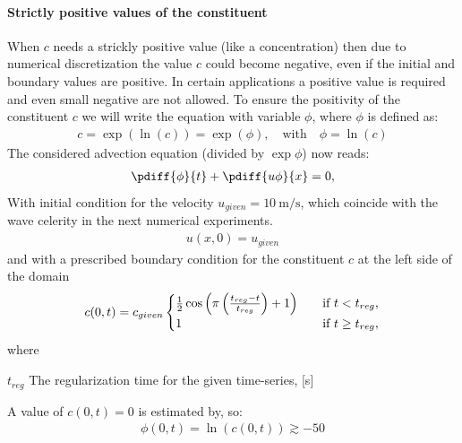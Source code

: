 \paragraph*{Strictly positive values of the constituent}
When $c$ needs a strickly positive value (like a concentration) then due to numerical discretization the value $c$ could become negative, even if the initial and boundary values are positive.
In certain applications a positive value is required and even small negative are not allowed.
To ensure the positivity of the constituent $c$ we will write the equation with variable $\phi$, where $\phi$ is defined as:
\begin{align}
    c = \exp(\ln(c)) =  \exp(\phi), \quad \text{with} \quad \phi = \ln(c)
\end{align}
The considered advection equation (divided by $\exp\phi$) now reads:
\begin{align}
    \pdiff{\phi}{t} + \pdiff{u\phi}{x} = 0,\label{eq:1d_advec_phi}
\end{align}
With initial condition for the velocity $u_{given} = \SI{10}{\metre\per\second}$, which coincide with the wave celerity in the next numerical experiments.
\begin{align}
    u(x,0) = u_{given}
\end{align}
and with a prescribed boundary condition for the constituent $c$ at the left side of the domain
\begin{align}
    c(0,t) = c_{given}
    \begin{cases}
        \frac{1}{2} \cos\left(\pi \left(\frac{t_{reg} - t}{t_{reg}}\right)+ 1\right) &\quad \text{if } t < t_{reg},
        \\
        1 &\quad \text{if } t \geq t_{reg},
    \end{cases}
\end{align}
where
\begin{symbollist}
    \item[$t_{reg}$] The regularization time for the given time-series, [\si{\second}]
\end{symbollist}
A value of $c(0,t)=0$ is estimated by, so:
\begin{align}
    \phi(0,t) = \ln(c(0,t)) \gtrsim -50
\end{align}
